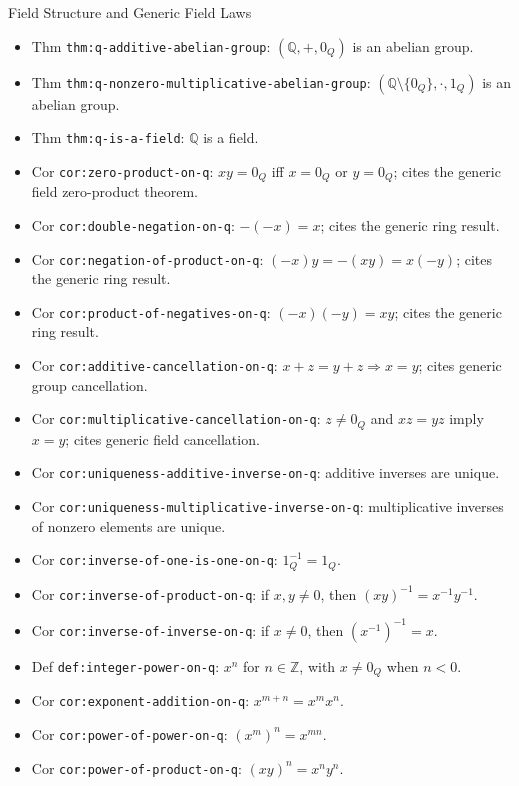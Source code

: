 \begin{topicbox}{Field Structure and Generic Field Laws}
\begin{itemize}
  \item Thm \texttt{thm:q-additive-abelian-group}: $(\mathbb{Q},+,0_Q)$ is an abelian group.
  \item Thm \texttt{thm:q-nonzero-multiplicative-abelian-group}: $(\mathbb{Q}\setminus\{0_Q\},\cdot,1_Q)$ is an abelian group.
  \item Thm \texttt{thm:q-is-a-field}: $\mathbb{Q}$ is a field.
  \item Cor \texttt{cor:zero-product-on-q}: $xy=0_Q$ iff $x=0_Q$ or $y=0_Q$; cites the generic field zero-product theorem.
  \item Cor \texttt{cor:double-negation-on-q}: $-(-x)=x$; cites the generic ring result.
  \item Cor \texttt{cor:negation-of-product-on-q}: $(-x)y=-(xy)=x(-y)$; cites the generic ring result.
  \item Cor \texttt{cor:product-of-negatives-on-q}: $(-x)(-y)=xy$; cites the generic ring result.
  \item Cor \texttt{cor:additive-cancellation-on-q}: $x+z=y+z\Rightarrow x=y$; cites generic group cancellation.
  \item Cor \texttt{cor:multiplicative-cancellation-on-q}: $z\ne0_Q$ and $xz=yz$ imply $x=y$; cites generic field cancellation.
  \item Cor \texttt{cor:uniqueness-additive-inverse-on-q}: additive inverses are unique.
  \item Cor \texttt{cor:uniqueness-multiplicative-inverse-on-q}: multiplicative inverses of nonzero elements are unique.
  \item Cor \texttt{cor:inverse-of-one-is-one-on-q}: $1_Q^{-1}=1_Q$.
  \item Cor \texttt{cor:inverse-of-product-on-q}: if $x,y\ne0$, then $(xy)^{-1}=x^{-1}y^{-1}$.
  \item Cor \texttt{cor:inverse-of-inverse-on-q}: if $x\ne0$, then $(x^{-1})^{-1}=x$.
  \item Def \texttt{def:integer-power-on-q}: $x^n$ for $n\in\mathbb{Z}$, with $x\ne0_Q$ when $n<0$.
  \item Cor \texttt{cor:exponent-addition-on-q}: $x^{m+n}=x^m x^n$.
  \item Cor \texttt{cor:power-of-power-on-q}: $(x^m)^n=x^{mn}$.
  \item Cor \texttt{cor:power-of-product-on-q}: $(xy)^n=x^n y^n$.
\end{itemize}
\end{topicbox}

